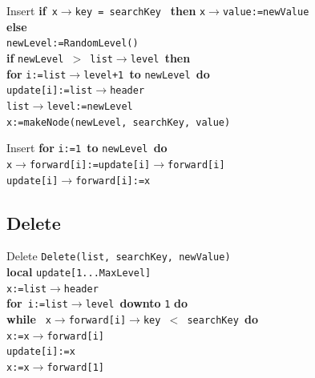 \documentclass[12pt]{beamer}
\begin{document}
\begin{frame}{Insert }
\quad \textbf{if}\texttt{ x$\rightarrow$key = searchKey } \textbf{then }\texttt{x$\rightarrow$value:=newValue} \\
\quad\textbf{else} \\
\quad\quad\texttt{newLevel:=RandomLevel()} \\
\quad\quad\textbf{if }\texttt{newLevel $>$ list$\rightarrow$level }\textbf{then}\\
\quad\quad\quad\textbf{for }\texttt{i:=list$\rightarrow$level+1 }\textbf{to }\texttt{newLevel }\textbf{do}\\
\quad\quad\quad\quad\texttt{update[i]:=list$\rightarrow$header}\\
\quad\quad\quad\texttt{list$\rightarrow$level:=newLevel}\\
\quad\quad\texttt{x:=makeNode(newLevel, searchKey, value)} \\
\end{frame}
\begin{frame}{Insert }
\quad\quad\textbf{for }\texttt{i:=1 }\textbf{to} \texttt{newLevel }\textbf{do} \\
\quad\quad\quad\texttt{x$\rightarrow$forward[i]:=update[i]$\rightarrow$forward[i]} \\
\quad\quad\quad\texttt{update[i]$\rightarrow$forward[i]:=x}
\quad\quad\quad
\end{frame}
\subsection{Delete}
\begin{frame}{Delete }
\texttt{Delete(list, searchKey, newValue)} \\
\quad \textbf{local }\texttt{update[1...MaxLevel]}\\
\quad \texttt{x:=list$\rightarrow$header} \\
\quad\textbf{for}\texttt{ i:=list$\rightarrow$level }\textbf{downto} \texttt{1} \textbf{do} \\
\quad \quad \textbf{while} \texttt{ x$\rightarrow$forward[i]$\rightarrow$key $<$ searchKey }\textbf{do} \\
\quad\quad\quad \texttt{x:=x$\rightarrow$forward[i]} \\
\quad\quad\texttt{update[i]:=x} \\
\quad \texttt{x:=x$\rightarrow$forward[1]} \\
\end{frame}
\end{document}
